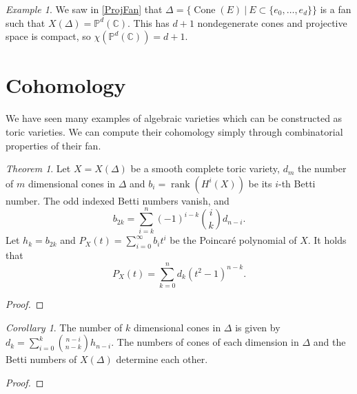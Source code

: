 \documentclass[BSc]{usydthesis}
\numberwithin{equation}{chapter}
\theoremstyle{remark}
\newtheorem{Theorem}[equation]{Theorem}
\newtheorem{Corollary}[equation]{Corollary}
\newtheorem{Example}[equation]{Example}
\newcommand{\C}{\mathbb{C}}
\newcommand{\Proj}{\mathbb{P}}
\DeclareMathOperator{\Cone}{Cone}
\begin{document}
\begin{Example}
 We saw in \ref{ProjFan} that $\Delta = \{ \Cone(E) \ | \ E\subset \{e_0, \ldots, e_d\} \}$ is a fan such that $X(\Delta) = \Proj^d(\C).$ This has $d+1$ nondegenerate cones and projective space is compact, so $\chi(\Proj^d(\C)) = d+1.$
\end{Example}




\section{Cohomology}

We have seen many examples of algebraic varieties which can be constructed as toric varieties. We can compute their cohomology simply through combinatorial properties of their fan. 

\begin{Theorem}
 Let $X=X(\Delta)$ be a smooth complete toric variety, $d_m$ the number of $m$ dimensional cones in $\Delta$ and $b_i = \operatorname{rank}( H^i(X) )$ be its $i$-th Betti number. The odd indexed Betti numbers vanish, and $$ b_{2k} = \sum_{i=k}^n (-1)^{i-k} \binom{i}{k} d_{n-i}.$$ Let $h_k = b_{2k}$ and $P_X(t) = \sum_{i=0}^{\infty} b_i t^i$ be the Poincar\'{e} polynomial of $X.$ It holds that $$ P_X(t) = \sum_{k=0}^n d_k (t^2-1)^{n-k}.$$
\end{Theorem}
\begin{proof}
 
\end{proof}

\begin{Corollary}
 The number of $k$ dimensional cones in $\Delta$ is given by $d_k =\displaystyle \sum_{i=0}^k \binom{n-i}{n-k} h_{n-i}.$ The numbers of cones of each dimension in $\Delta$ and the Betti numbers of $X(\Delta)$ determine each other.
\end{Corollary}
\begin{proof}
 

\end{proof}
\end{document}
